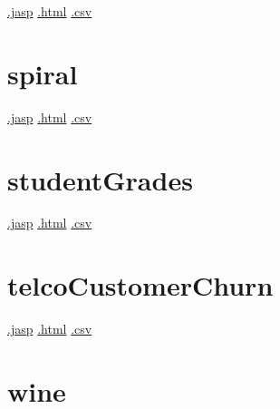 \documentclass[
  letterpaper,
  DIV=11,
  numbers=noendperiod]{scrreprt}
\begin{document}
\textbar{}
\href{https://github.com/jasp-stats/jasp-data-library/raw/main/policeCadetEvaluation/policeCadetEvaluation.jasp}{.jasp}
\textbar{}
\href{https://htmlpreview.github.io/?https://github.com/jasp-stats/jasp-data-library/blob/main/policeCadetEvaluation/index.html}{.html}
\textbar{}
\href{https://raw.githubusercontent.com/jasp-stats/jasp-data-library/main/policeCadetEvaluation/policeCadetEvaluation.csv}{.csv}

\hypertarget{spiral}{%
\section{spiral}\label{spiral}}

\textbar{}
\href{https://github.com/jasp-stats/jasp-data-library/raw/main/spiral/spiral.jasp}{.jasp}
\textbar{}
\href{https://htmlpreview.github.io/?https://github.com/jasp-stats/jasp-data-library/blob/main/spiral/index.html}{.html}
\textbar{}
\href{https://raw.githubusercontent.com/jasp-stats/jasp-data-library/main/spiral/spiral.csv}{.csv}

\hypertarget{studentgrades}{%
\section{studentGrades}\label{studentgrades}}

\textbar{}
\href{https://github.com/jasp-stats/jasp-data-library/raw/main/studentGrades/studentGrades.jasp}{.jasp}
\textbar{}
\href{https://htmlpreview.github.io/?https://github.com/jasp-stats/jasp-data-library/blob/main/studentGrades/index.html}{.html}
\textbar{}
\href{https://raw.githubusercontent.com/jasp-stats/jasp-data-library/main/studentGrades/studentGrades.csv}{.csv}

\hypertarget{telcocustomerchurn}{%
\section{telcoCustomerChurn}\label{telcocustomerchurn}}

\textbar{}
\href{https://github.com/jasp-stats/jasp-data-library/raw/main/telcoCustomerChurn/telcoCustomerChurn.jasp}{.jasp}
\textbar{}
\href{https://htmlpreview.github.io/?https://github.com/jasp-stats/jasp-data-library/blob/main/telcoCustomerChurn/index.html}{.html}
\textbar{}
\href{https://raw.githubusercontent.com/jasp-stats/jasp-data-library/main/telcoCustomerChurn/telcoCustomerChurn.csv}{.csv}

\hypertarget{wine}{%
\section{wine}\label{wine}}
\end{document}
